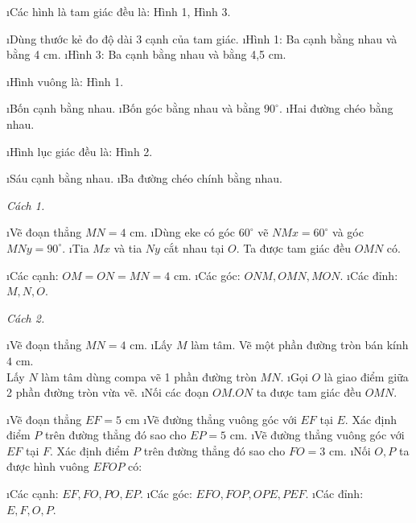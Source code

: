 \begin{Answer}{58}
		\begin{enumerate}[a), leftmargin=*]
			\i Các hình là tam giác đều là: Hình 1, Hình 3.
			\begin{enumerate}[--, leftmargin=*]
				\i Dùng thước kẻ đo độ dài 3 cạnh của tam giác.
				\i Hình 1: Ba cạnh bằng nhau và bằng 4 cm.
				\i Hình 3: Ba cạnh bằng nhau và bằng 4,5 cm.
			\end{enumerate}
			\i Hình vuông là: Hình 1.
			\begin{enumerate}[--, leftmargin=*]
				\i Bốn cạnh bằng nhau.
				\i Bốn góc bằng nhau và bằng $90^\circ$.
				\i Hai đường chéo bằng nhau.
			\end{enumerate}
			\i Hình lục giác đều là: Hình 2.
			\begin{enumerate}[--, leftmargin=*]
				\i Sáu cạnh bằng nhau.
				\i Ba đường chéo chính bằng nhau.
			\end{enumerate}
		\end{enumerate}
	
\end{Answer}
\begin{Answer}{59}
		\textit{Cách 1.}
		\begin{enumerate}[Bước 1:, leftmargin=*]
			\i Vẽ đoạn thẳng $MN =4$ cm.
			\i Dùng eke có góc $60^\circ$ vẽ $NMx = 60^\circ$ và góc  $MNy = 90^\circ$.
			\i Tia $Mx$ và tia $Ny$ cắt nhau tại $O$.
			Ta được tam giác đều $OMN$ có.
			\begin{enumerate}[+, leftmargin=*]
				\i Các cạnh:  $OM = ON = MN = 4$ cm.
				\i Các góc:  $ONM, OMN, MON$.
				\i Các đỉnh: $M, N, O$.
			\end{enumerate}
		\end{enumerate}
		\textit{Cách 2.}
		\begin{enumerate}[Bước 1:, leftmargin=*]
			\i Vẽ đoạn thẳng  $MN = 4$ cm.
			\i Lấy $M$ làm tâm. Vẽ một phần đường tròn bán kính  $4$ cm.\\
			 Lấy $N$ làm tâm dùng compa vẽ 1 phần đường tròn $MN$.
			\i Gọi $O$ là giao điểm giữa 2 phần đường tròn vừa vẽ.
			\i Nối các đoạn $OM. ON$ ta được tam giác đều $OMN$.
		\end{enumerate}
	
\end{Answer}
\begin{Answer}{60}
		\begin{enumerate}[Bước 1:, leftmargin=*]
			\i Vẽ đoạn thẳng $EF = 5$ cm
			\i Vẽ đường thẳng vuông góc với $EF$  tại $E$. Xác định điểm $P$  trên đường thẳng đó sao cho $EP = 5$ cm.
			\i Vẽ đường thẳng vuông góc với $EF$  tại $F$.  Xác định điểm $P$  trên đường thẳng đó sao cho $FO = 3$ cm.
			\i Nối $O,P$  ta được hình vuông  $EFOP$ có:
			\begin{enumerate}[--, leftmargin=*]
				\i Các cạnh: $EF, FO, PO, EP$.
				\i Các góc: $EFO, FOP, OPE, PEF$.
				\i Các đỉnh: $E,F,O,P$.
			\end{enumerate}
		\end{enumerate}
	
\end{Answer}
